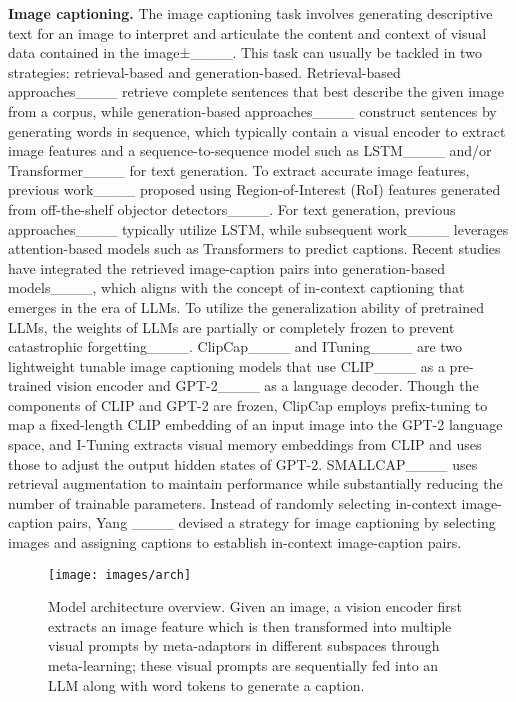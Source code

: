 \noindent \textbf{Image captioning.} 
The image captioning task involves generating descriptive text for an image to interpret and articulate the content and context of visual data contained in the image±____. This task can usually be tackled in two strategies: retrieval-based and generation-based. Retrieval-based approaches____ retrieve complete sentences that best describe the given image from a corpus, while generation-based approaches____ construct sentences by generating words in sequence, which typically contain a visual encoder to extract image features and a sequence-to-sequence model such as LSTM____ and/or Transformer____ for text generation. To extract accurate image features, previous work____ proposed using Region-of-Interest (RoI) features generated from off-the-shelf objector detectors____. For text generation, previous approaches____ typically utilize LSTM, while subsequent work____ leverages attention-based models such as Transformers to predict captions. Recent studies have integrated the retrieved image-caption pairs into generation-based models____, which aligns with the concept of in-context captioning that emerges in the era of LLMs. To utilize the generalization ability of pretrained LLMs, the weights of LLMs are partially or completely frozen to prevent catastrophic forgetting____. ClipCap____ and ITuning____ are two lightweight tunable image captioning models that use CLIP____ as a pre-trained vision encoder and GPT-2____ as a language decoder. Though the components of CLIP and GPT-2 are frozen, ClipCap employs prefix-tuning to map a fixed-length CLIP embedding of an input image into the GPT-2 language space, and I-Tuning extracts visual memory embeddings from CLIP and uses those to adjust the output hidden states of GPT-2. SMALLCAP____ uses retrieval augmentation to maintain performance while substantially reducing the number of trainable parameters. Instead of randomly selecting in-context image-caption pairs, Yang \etal____ devised a strategy for image captioning by selecting images and assigning captions to establish in-context image-caption pairs.

%
\begin{figure*}[!htb]
    \centering
    \texttt{[image: images/arch]}
    \caption{Model architecture overview. Given an image, a vision encoder first extracts an image feature which is then transformed into multiple visual prompts by meta-adaptors in different subspaces through meta-learning; these visual prompts
are sequentially fed into an LLM along with word tokens to generate a caption.}
    \label{fig:arch}
\end{figure*}
%